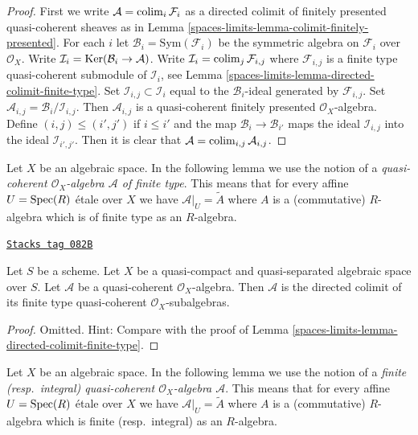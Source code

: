 \begin{proof}
First we write $\mathcal{A} = \operatorname{colim}_i \mathcal{F}_i$ as a directed
colimit of finitely presented quasi-coherent sheaves as in
Lemma \ref{spaces-limits-lemma-colimit-finitely-presented}.
For each $i$ let $\mathcal{B}_i = \text{Sym}(\mathcal{F}_i)$ be the
symmetric algebra on $\mathcal{F}_i$ over $\mathcal{O}_X$. Write
$\mathcal{I}_i = \operatorname{Ker}(\mathcal{B}_i \to \mathcal{A})$. Write
$\mathcal{I}_i = \operatorname{colim}_j \mathcal{F}_{i, j}$ where
$\mathcal{F}_{i, j}$ is a finite type quasi-coherent submodule of
$\mathcal{I}_i$, see
Lemma \ref{spaces-limits-lemma-directed-colimit-finite-type}.
Set $\mathcal{I}_{i, j} \subset \mathcal{I}_i$
equal to the $\mathcal{B}_i$-ideal generated by $\mathcal{F}_{i, j}$.
Set $\mathcal{A}_{i, j} = \mathcal{B}_i/\mathcal{I}_{i, j}$.
Then $\mathcal{A}_{i, j}$ is a quasi-coherent finitely presented
$\mathcal{O}_X$-algebra. Define $(i, j) \leq (i', j')$ if
$i \leq i'$ and the map $\mathcal{B}_i \to \mathcal{B}_{i'}$
maps the ideal $\mathcal{I}_{i, j}$ into the ideal $\mathcal{I}_{i', j'}$.
Then it is clear that $\mathcal{A} = \operatorname{colim}_{i, j} \mathcal{A}_{i, j}$.
\end{proof}

Let $X$ be an algebraic space. In the following lemma we use the notion
of a {\it quasi-coherent $\mathcal{O}_X$-algebra $\mathcal{A}$
of finite type}. This means that for every affine
$U = \operatorname{Spec}(R)$ \'etale over $X$ we have $\mathcal{A}|_U = \widetilde{A}$
where $A$ is a (commutative) $R$-algebra which is of finite type
as an $R$-algebra.

\begin{lemma}
\label{spaces-limits-lemma-algebra-directed-colimit-finite-type}
\href{https://stacks.math.columbia.edu/tag/082B}{\texttt{Stacks tag 082B}}

Let $S$ be a scheme. Let $X$ be a quasi-compact and quasi-separated algebraic
space over $S$. Let $\mathcal{A}$ be a quasi-coherent $\mathcal{O}_X$-algebra.
Then $\mathcal{A}$ is the directed colimit of its finite type
quasi-coherent $\mathcal{O}_X$-subalgebras.
\end{lemma}

\begin{proof}
Omitted. Hint: Compare with the proof of
Lemma \ref{spaces-limits-lemma-directed-colimit-finite-type}.
\end{proof}

Let $X$ be an algebraic space. In the following lemma we use the notion
of a {\it finite (resp.\ integral) quasi-coherent
$\mathcal{O}_X$-algebra $\mathcal{A}$}. This means that for every
affine $U = \operatorname{Spec}(R)$ \'etale over $X$ we have
$\mathcal{A}|_U = \widetilde{A}$ where $A$ is a (commutative) $R$-algebra
which is finite (resp.\ integral) as an $R$-algebra.

